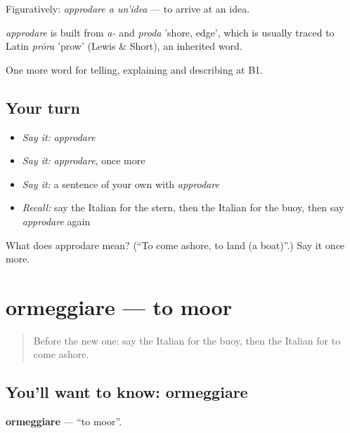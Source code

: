Figuratively: \emph{approdare a un'idea} — to arrive at an idea.

\begin{cousinweb}
\emph{approdare} is built from \emph{a-} and \emph{proda} 'shore, edge', which is usually traced to Latin \emph{prōra} 'prow' (Lewis \& Short), an inherited word.
\end{cousinweb}

\begin{grammarlens}[title={What you've built}]
One more word for telling, explaining and describing at B1.
\end{grammarlens}

\subsection*{Your turn}
\begin{itemize}
\raggedright
  \item \emph{Say it:} \emph{approdare}
  \item \emph{Say it:} \emph{approdare}, once more
  \item \emph{Say it:} a sentence of your own with \emph{approdare}
  \item \emph{Recall:} say the Italian for the stern, then the Italian for the buoy, then say \emph{approdare} again
\end{itemize}

\begin{tcolorbox}[breakable,colback=teal!4,colframe=teal!35!black,title={Before you move on}]
What does approdare mean? (\textquotedblleft{}To come ashore, to land (a boat)\textquotedblright{}.) Say it once more.
\end{tcolorbox}
\section[ormeggiare]{ormeggiare — to moor}

\label{lesson:IT-C424-ormeggiare}



\begin{quote}
Before the new one: say the Italian for the buoy, then the Italian for to come ashore.
\end{quote}

\subsection*{You'll want to know: ormeggiare}
\textbf{ormeggiare} — \textquotedblleft{}to moor\textquotedblright{}.

